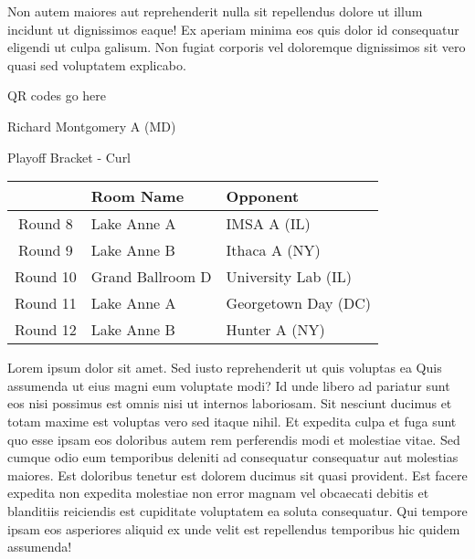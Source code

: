 \documentclass{article}%
\begin{document}
\newline%
Non autem maiores aut reprehenderit nulla sit repellendus dolore ut illum incidunt ut dignissimos eaque! Ex aperiam minima eos quis dolor id consequatur eligendi ut culpa galisum. Non fugiat corporis vel doloremque dignissimos sit vero quasi sed voluptatem explicabo.\newline%
\newline%
%
\vspace*{30pt}%
\begin{center}%
\begin{Huge}%
QR codes go here%
\end{Huge}%
\end{center}%
\newpage%
\begin{center}%
\begin{Huge}%
Richard Montgomery A (MD)%
\end{Huge}%
\vspace*{8pt}%
\linebreak%
\begin{Large}%
Playoff Bracket {-} Curl%
\end{Large}%
\end{center}%
\begin{tabularx}{\textwidth}{|c|Y|Y|}%
\hline%
&Room Name&Opponent\\%
\hline%
Round 8&Lake Anne A&IMSA A (IL)\\%
Round 9&Lake Anne B&Ithaca A (NY)\\%
Round 10&Grand Ballroom D&University Lab (IL)\\%
Round 11&Lake Anne A&Georgetown Day (DC)\\%
Round 12&Lake Anne B&Hunter A (NY)\\%
\hline%
\end{tabularx}%
\vspace*{8pt}%
\linebreak%
\newline%
\newline%
Lorem ipsum dolor sit amet. Sed iusto reprehenderit ut quis voluptas ea Quis assumenda ut eius magni eum voluptate modi? Id unde libero ad pariatur sunt eos nisi possimus est omnis nisi ut internos laboriosam. Sit nesciunt ducimus et totam maxime est voluptas vero sed itaque nihil. Et expedita culpa et fuga sunt quo esse ipsam eos doloribus autem rem perferendis modi et molestiae vitae.\newline%
\newline%
Sed cumque odio eum temporibus deleniti ad consequatur consequatur aut molestias maiores. Est doloribus tenetur est dolorem ducimus sit quasi provident. Est facere expedita non expedita molestiae non error magnam vel obcaecati debitis et blanditiis reiciendis est cupiditate voluptatem ea soluta consequatur. Qui tempore ipsam eos asperiores aliquid ex unde velit est repellendus temporibus hic quidem assumenda!\newline%
\end{document}
